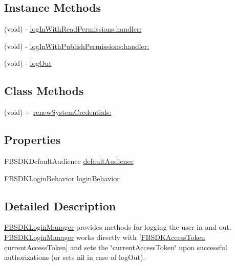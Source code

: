 \subsection*{Instance Methods}
\begin{DoxyCompactItemize}
\item 
(void) -\/ \hyperlink{interface_f_b_s_d_k_login_manager_a1bdaae27d9f264a26994bf49c36d0e6d}{log\-In\-With\-Read\-Permissions\-:handler\-:}
\item 
(void) -\/ \hyperlink{interface_f_b_s_d_k_login_manager_aa2035dddc4457dfe8f1cda68d29a7106}{log\-In\-With\-Publish\-Permissions\-:handler\-:}
\item 
(void) -\/ \hyperlink{interface_f_b_s_d_k_login_manager_a4fa13ba37d31c17cc1f1f1f32d309bec}{log\-Out}
\end{DoxyCompactItemize}
\subsection*{Class Methods}
\begin{DoxyCompactItemize}
\item 
(void) + \hyperlink{interface_f_b_s_d_k_login_manager_af200973975f71cc6c74926f5f3f4aac6}{renew\-System\-Credentials\-:}
\end{DoxyCompactItemize}
\subsection*{Properties}
\begin{DoxyCompactItemize}
\item 
F\-B\-S\-D\-K\-Default\-Audience \hyperlink{interface_f_b_s_d_k_login_manager_a4f662c89be174bb577acf75f95aefbc0}{default\-Audience}
\item 
F\-B\-S\-D\-K\-Login\-Behavior \hyperlink{interface_f_b_s_d_k_login_manager_a6380b50840262848d8fd3e224de9f520}{login\-Behavior}
\end{DoxyCompactItemize}


\subsection{Detailed Description}
{\ttfamily \hyperlink{interface_f_b_s_d_k_login_manager}{F\-B\-S\-D\-K\-Login\-Manager}} provides methods for logging the user in and out.  {\ttfamily \hyperlink{interface_f_b_s_d_k_login_manager}{F\-B\-S\-D\-K\-Login\-Manager}} works directly with {\ttfamily \mbox{[}\hyperlink{interface_f_b_s_d_k_access_token}{F\-B\-S\-D\-K\-Access\-Token} current\-Access\-Token\mbox{]}} and sets the \char`\"{}current\-Access\-Token\char`\"{} upon successful authorizations (or sets {\ttfamily nil} in case of {\ttfamily log\-Out}).

